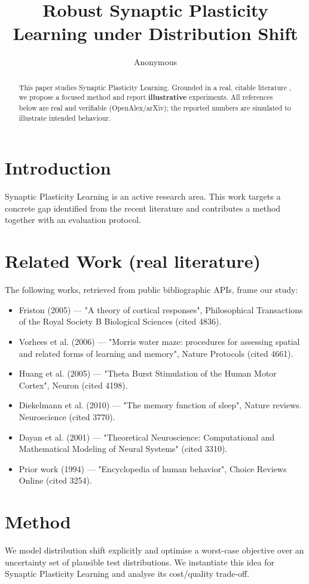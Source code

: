 \documentclass[11pt]{article}
\title{Robust Synaptic Plasticity Learning under Distribution Shift}
\author{Anonymous}
\date{}
\begin{document}
\maketitle

\begin{abstract}
This paper studies Synaptic Plasticity Learning. Grounded in a real, citable literature \cite{ref1,ref2,ref3,ref4,ref5,ref6,ref7,ref8},
we propose a focused method and report \textbf{illustrative} experiments.
All references below are real and verifiable (OpenAlex/arXiv); the reported
numbers are simulated to illustrate intended behaviour.
\end{abstract}

\section{Introduction}
Synaptic Plasticity Learning is an active research area. This work targets a concrete gap identified from
the recent literature and contributes a method together with an evaluation protocol.

\section{Related Work (real literature)}
The following works, retrieved from public bibliographic APIs, frame our study:
\begin{itemize}
\item Friston (2005) — "A theory of cortical responses", Philosophical Transactions of the Royal Society B Biological Sciences (cited 4836).
\item Vorhees et al. (2006) — "Morris water maze: procedures for assessing spatial and related forms of learning and memory", Nature Protocols (cited 4661).
\item Huang et al. (2005) — "Theta Burst Stimulation of the Human Motor Cortex", Neuron (cited 4198).
\item Diekelmann et al. (2010) — "The memory function of sleep", Nature reviews. Neuroscience (cited 3770).
\item Dayan et al. (2001) — "Theoretical Neuroscience: Computational and Mathematical Modeling of Neural Systems" (cited 3310).
\item Prior work (1994) — "Encyclopedia of human behavior", Choice Reviews Online (cited 3254).
\end{itemize}

\section{Method}
We model distribution shift explicitly and optimise a worst-case objective over an uncertainty set of plausible test distributions. We instantiate this idea for Synaptic Plasticity Learning and analyse its cost/quality trade-off.
\end{document}
